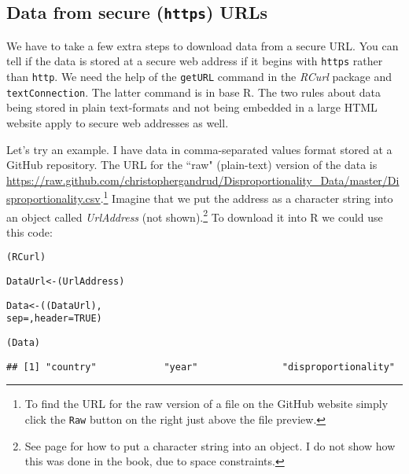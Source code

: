 \subsection{Data from secure ({\tt{https}}) URLs}\label{SecureDataDownload}

\noindent We have to take a few extra steps to download data from a secure URL. You can tell if the data is stored at a secure web address if it begins with \texttt{https} rather than \texttt{http}. We need the help of the \texttt{getURL} command in the {\emph{RCurl}} package \cite[]{R-RCurl} and \texttt{textConnection}. The latter command is in base R. The two rules about data being stored in plain text-formats and not being embedded in a large HTML website apply to secure web addresses as well.

Let's try an example. I have data in comma-separated values format stored at a GitHub repository. The URL for the ``raw" (plain-text) version of the data is \url{https://raw.github.com/christophergandrud/Disproportionality_Data/master/Disproportionality.csv}.\footnote{To find the URL for the raw version of a file on the GitHub website simply click the \texttt{Raw} button on the right just above the file preview.} Imagine that we put the address as a character string into an object called \emph{UrlAddress} (not shown).\footnote{See page \pageref{Objects} for how to put a character string into an object. I do not show how this was done in the book, due to space constraints.}
To download it into R we could use this code:




{\small
\begin{knitrout}
\color{fgcolor}\begin{kframe}
\begin{alltt}
(RCurl)

DataUrl <- (UrlAddress)

Data <- ((DataUrl), 
					sep = , header = TRUE)
					
(Data)
\end{alltt}
\begin{verbatim}
## [1] "country"            "year"               "disproportionality"
\end{verbatim}
\end{kframe}
\end{knitrout}

}

